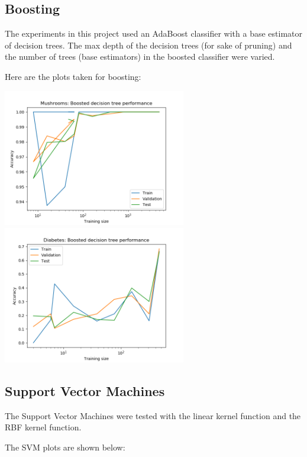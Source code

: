 \documentclass[11pt]{article}
\begin{document}
        \subsection{Boosting}
        The experiments in this project used an AdaBoost classifier with a base estimator of decision trees.
        The max depth of the decision trees (for sake of pruning) and the number of trees (base estimators)
        in the boosted classifier were varied.

        Here are the plots taken for boosting:
        
        \includegraphics[width=8cm]{mushrooms/mushroom_boost_trainingsize.png}
        \includegraphics[width=8cm]{diabetes/diabetes_boost_trainingsize.png}

        \subsection{Support Vector Machines}
        The Support Vector Machines were tested with the linear kernel function and the RBF kernel function.

        The SVM plots are shown below:
\end{document}
